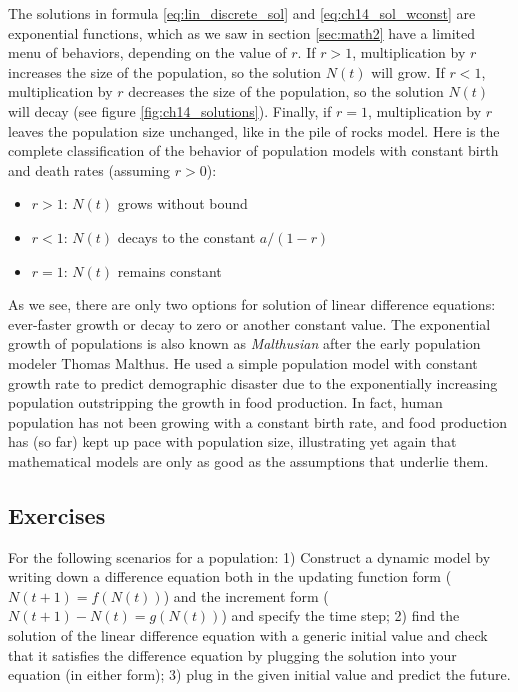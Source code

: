 \documentclass[
  letterpaper,
  DIV=11,
  numbers=noendperiod]{scrreprt}
\providecommand{\tightlist}{%
  \setlength{\itemsep}{0pt}\setlength{\parskip}{0pt}}\usepackage{longtable,booktabs,array}
\begin{document}
The solutions in formula \ref{eq:lin_discrete_sol} and
\ref{eq:ch14_sol_wconst} are exponential functions, which as we saw in
section \ref{sec:math2} have a limited menu of behaviors, depending on
the value of \(r\). If \(r > 1\), multiplication by \(r\) increases the
size of the population, so the solution \(N(t)\) will grow. If
\(r < 1\), multiplication by \(r\) decreases the size of the population,
so the solution \(N(t)\) will decay (see figure
\ref{fig:ch14_solutions}). Finally, if \(r=1\), multiplication by \(r\)
leaves the population size unchanged, like in the pile of rocks model.
Here is the complete classification of the behavior of population models
with constant birth and death rates (assuming \(r>0\)):

\begin{itemize}
\tightlist
\item
  \(r > 1\): \(N(t)\) grows without bound
\item
  \(r < 1\): \(N(t)\) decays to the constant \(a/(1-r)\)
\item
  \(r = 1\): \(N(t)\) remains constant
\end{itemize}

As we see, there are only two options for solution of linear difference
equations: ever-faster growth or decay to zero or another constant
value. The exponential growth of populations is also known as
 \emph{Malthusian} after the early
population modeler Thomas Malthus. He used a simple population model
with constant growth rate to predict demographic disaster due to the
exponentially increasing population outstripping the growth in food
production. In fact, human population has not been growing with a
constant birth rate, and food production has (so far) kept up pace with
population size, illustrating yet again that mathematical models are
only as good as the assumptions that underlie them.

\hypertarget{exercises-14}{%
\subsection{Exercises}\label{exercises-14}}

For the following scenarios for a population: 1) Construct a dynamic
model by writing down a difference equation both in the updating
function form (\(N(t+1) = f(N(t))\)) and the increment form
(\(N(t+1) - N(t) = g(N(t))\)) and specify the time step; 2) find the
solution of the linear difference equation with a generic initial value
and check that it satisfies the difference equation by plugging the
solution into your equation (in either form); 3) plug in the given
initial value and predict the future.
\end{document}
